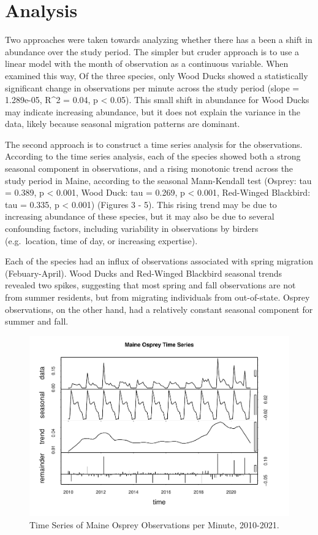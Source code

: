 \documentclass[
  12pt,
]{article}
\begin{document}
\newpage

\hypertarget{analysis}{%
\section{Analysis}\label{analysis}}

Two approaches were taken towards analyzing whether there has a been a
shift in abundance over the study period. The simpler but cruder
approach is to use a linear model with the month of observation as a
continuous variable. When examined this way, Of the three species, only
Wood Ducks showed a statistically significant change in observations per
minute across the study period (slope = 1.289e-05, R\^{}2 = 0.04, p
\textless{} 0.05). This small shift in abundance for Wood Ducks may
indicate increasing abundance, but it does not explain the variance in
the data, likely because seasonal migration patterns are dominant.

The second approach is to construct a time series analysis for the
observations. According to the time series analysis, each of the species
showed both a strong seasonal component in observations, and a rising
monotonic trend across the study period in Maine, according to the
seasonal Mann-Kendall test (Osprey: tau = 0.389, p \textless{} 0.001,
Wood Duck: tau = 0.269, p \textless{} 0.001, Red-Winged Blackbird: tau =
0.335, p \textless{} 0.001) (Figures 3 - 5). This rising trend may be
due to increasing abundance of these species, but it may also be due to
several confounding factors, including variability in observations by
birders (e.g.~location, time of day, or increasing expertise).

Each of the species had an influx of observations associated with spring
migration (Febuary-April). Wood Ducks and Red-Winged Blackbird seasonal
trends revealed two spikes, suggesting that most spring and fall
observations are not from summer residents, but from migrating
individuals from out-of-state. Osprey observations, on the other hand,
had a relatively constant seasonal component for summer and fall.

\begin{figure}
\centering
\includegraphics{Project_report_ME_files/figure-latex/Time.SeriesO-1.pdf}
\caption{Time Series of Maine Osprey Observations per Minute,
2010-2021.}
\end{figure}
\end{document}
